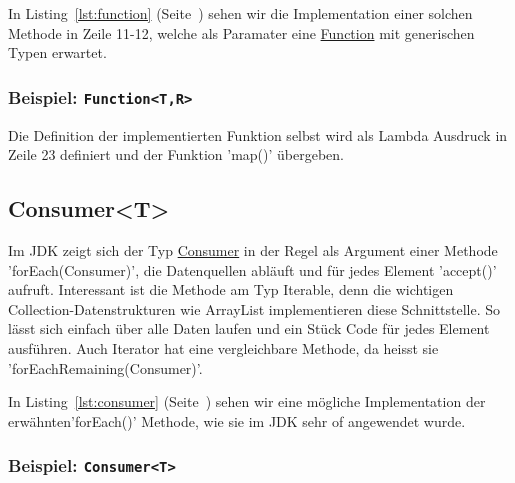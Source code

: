 In Listing~\ref{lst:function} (Seite~\pageref{lst:function}) sehen wir die Implementation
einer solchen Methode in Zeile 11-12, welche als Paramater eine
\href{https://docs.oracle.com/en/java/javase/11/docs/api/java.base/java/util/function/Function.html}
{Function} mit generischen Typen erwartet.


\begin{frame}[fragile]
    \frametitle<presentation>{Beispiel: \texttt{Function<T,R>}}

\end{frame}

\mode*
{}

Die Definition der implementierten Funktion selbst wird als Lambda Ausdruck in
Zeile 23 definiert und der Funktion 'map()' übergeben.


\subsection{Consumer<T>}
\label{subsec:consumer}

Im JDK zeigt sich der Typ
\href{https://docs.oracle.com/en/java/javase/11/docs/api/java.base/java/util/function/Consumer.html}
{Consumer}
in der Regel als Argument einer Methode 'forEach(Consumer)', die Datenquellen abläuft und für
jedes Element 'accept()' aufruft. Interessant ist die Methode am Typ Iterable, denn die
wichtigen Collection-Datenstrukturen wie ArrayList implementieren diese Schnittstelle.
So lässt sich einfach über alle Daten laufen und ein Stück Code für jedes Element
ausführen. Auch Iterator hat eine vergleichbare Methode, da heisst sie 'forEachRemaining(Consumer)'.

In Listing~\ref{lst:consumer} (Seite~\pageref{lst:consumer}) sehen wir eine mögliche Implementation
der erwähnten'forEach()' Methode, wie sie im JDK sehr of angewendet wurde.

\begin{frame}[fragile]
    \frametitle<presentation>{Beispiel: \texttt{Consumer<T>}}

\end{frame}

